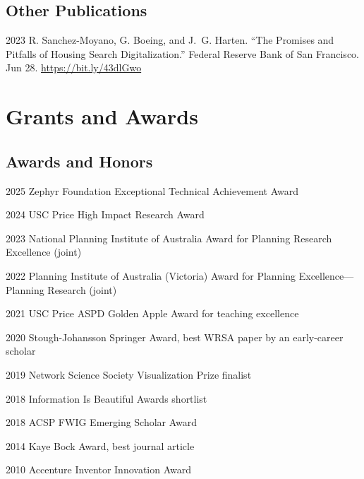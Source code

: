 \documentclass[11pt,letterpaper]{report} %
\begin{document}

    \subsection*{Other Publications}

    \begin{tablist}

        \item[2023] \tab{}R. Sanchez-Moyano, G. Boeing, and J.~G. Harten. \enquote{The Promises and Pitfalls of Housing Search Digitalization.} Federal Reserve Bank of San Francisco. Jun 28. \href{https://bit.ly/43dlGwo}{https://bit.ly/43dlGwo}


    \end{tablist}

    \section*{Grants and Awards}

    \subsection*{Awards and Honors}

    \begin{tablist}

        \item[2025] \tab{}Zephyr Foundation Exceptional Technical Achievement Award
        \item[2024] \tab{}USC Price High Impact Research Award
        \item[2023] \tab{}National Planning Institute of Australia Award for Planning Research Excellence (joint)
        \item[2022] \tab{}Planning Institute of Australia (Victoria) Award for Planning Excellence---Planning Research (joint)
        \item[2021] \tab{}USC Price ASPD Golden Apple Award for teaching excellence
        \item[2020] \tab{}Stough-Johansson Springer Award, best WRSA paper by an early-career scholar
        \item[2019] \tab{}Network Science Society Visualization Prize finalist
        \item[2018] \tab{}Information Is Beautiful Awards shortlist
        \item[2018] \tab{}ACSP FWIG Emerging Scholar Award
        \item[2014] \tab{}Kaye Bock Award, best journal article
        \item[2010] \tab{}Accenture Inventor Innovation Award

    \end{tablist}
\end{document}
